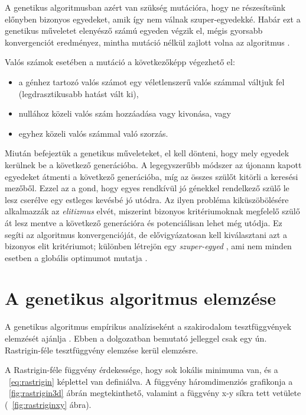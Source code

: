 A genetikus algoritmusban azért van szükség mutációra, hogy ne részesítsünk előnyben bizonyos egyedeket, amik így nem válnak szuper-egyedekké. Habár ezt a genetikus műveletet elenyésző számú egyeden végzik el, mégis gyorsabb konvergenciót eredményez, mintha mutáció nélkül zajlott volna az algoritmus \parencite{kanovic2017}.

Valós számok esetében a mutáció a következőképp végezhető el:

\begin{itemize}
    \item a génhez tartozó valós számot egy véletlenszerű valós számmal váltjuk fel (legdrasztikusabb hatást vált ki),
	\item nullához közeli valós szám hozzáadása vagy kivonása, vagy
	\item egyhez közeli valós számmal való szorzás.
\end{itemize}

Miután befejeztük a genetikus műveleteket, el kell dönteni, hogy mely egyedek kerülnek be a következő generációba. A legegyszerűbb módszer az újonann kapott egyedeket átmenti a következő generációba, míg az összes szülőt kitörli a keresési mezőből. Ezzel az a gond, hogy egyes rendkívül jó génekkel rendelkező szülő le lesz cserélve egy estleges kevésbé jó utódra. Az ilyen probléma kiküszöbölésére alkalmazzák az \textit{elitizmus}  elvét, miszerint bizonyos kritériumoknak megfelelő szülő át lesz mentve a következő generációra és potenciálisan lehet még utódja. Ez segíti az algoritmus konvergencióját, de elővigyázatosan kell kiválasztani azt a bizonyos elit kritériumot; különben létrejön egy \textit{szuper-egyed} , ami nem minden esetben a globális optimumot mutatja \parencite{kanovic2017}.

\section{A genetikus algoritmus elemzése}

A genetikus algoritmus empírikus analíziseként a szakirodalom tesztfüggvények elemzését ajánlja \parencite{kanovic2017}. Ebben a dolgozatban bemutató jelleggel csak egy ún. Rastrigin-féle tesztfüggvény  elemzése kerül elemzésre.

A Rastrigin-féle függvény érdekessége, hogy sok lokális minimuma van, és a ~\ref{eq:rastrigin} képlettel van definiálva. A függvény háromdimenziós grafikonja a ~\ref{fig:rastrigin3d} ábrán megtekinthető, valamint a függvény x-y síkra tett vetülete (~\ref{fig:rastriginxy} ábra).

